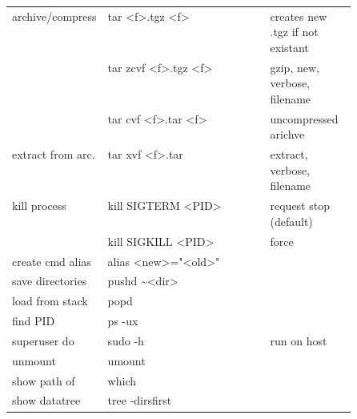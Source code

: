 {\begin{tabularx}{\linewidth}{@{} p{0.25\linewidth}>{\ttfamily}lp{0.25\linewidth} @{}}
    \end{tabularx}
    \begin{tabularx}{\linewidth}{@{} p{0.25\linewidth}>{\ttfamily}lp{0.25\linewidth} @{}}
        archive/compress  & tar <f>.tgz <f>            & creates new .tgz if not existant \\
                          & tar zcvf <f>.tgz <f>       & gzip, new, verbose, filename     \\
                          & tar cvf <f>.tar <f>        & uncompressed arichve             \\
        extract from arc. & tar xvf <f>.tar            & extract, verbose, filename       \\
        kill process      & kill SIGTERM <PID>         & request stop (default)           \\
                          & kill SIGKILL <PID>         & force                            \\
        create cmd alias  & alias <new>="<old>"        &                                  \\
        save directories  & pushd \textasciitilde<dir> &                                  \\
        load from stack   & popd                       &                                  \\
        find PID          & ps -ux                     &                                  \\
        superuser do      & sudo -h                    & run on host                      \\
        unmount           & umount                     &                                  \\
        show path of      & which                      &                                  \\
        show datatree     & tree -dirsfirst            &                                  \\
        \bottomrule
    \end{tabularx}
} %
\renewcommand{\arraystretch}{1}
\setlength\tabcolsep{6pt} %



